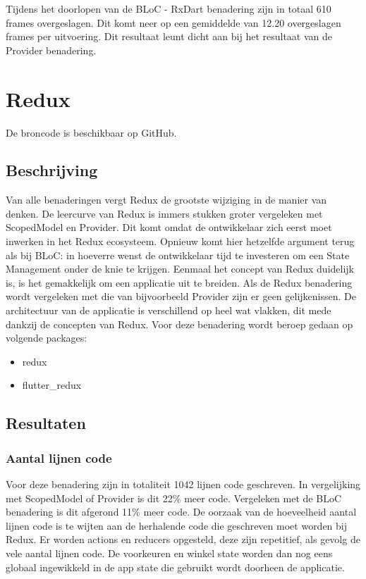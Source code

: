 Tijdens het doorlopen van de BLoC - RxDart benadering zijn in totaal 610 frames overgeslagen. Dit komt neer op een gemiddelde van 12.20 overgeslagen frames per uitvoering. Dit resultaat leunt dicht aan bij het resultaat van de Provider benadering.

\section{Redux}
De broncode is beschikbaar op GitHub. \autocite{DeVrient2019d}
\subsection{Beschrijving}
Van alle benaderingen vergt Redux de grootste wijziging in de manier van denken. De leercurve van Redux is immers stukken groter vergeleken met ScopedModel en Provider. Dit komt omdat de ontwikkelaar zich eerst moet inwerken in het Redux ecosysteem. Opnieuw komt hier hetzelfde argument terug als bij BLoC: in hoeverre wenst de ontwikkelaar tijd te investeren om een State Management onder de knie te krijgen. Eenmaal het concept van Redux duidelijk is, is het gemakkelijk om een applicatie uit te breiden. 
Als de Redux benadering wordt vergeleken met die van bijvoorbeeld Provider zijn er geen gelijkenissen. De architectuur van de applicatie is verschillend op heel wat vlakken, dit mede dankzij de concepten van Redux. \newline \newline
Voor deze benadering wordt beroep gedaan op volgende packages: 
\begin{itemize}
    \item{redux}
    \item{flutter\_redux}
\end{itemize}
\subsection{Resultaten}


\subsubsection{Aantal lijnen code}
Voor deze benadering zijn in totaliteit 1042 lijnen code geschreven. In vergelijking met ScopedModel of Provider is dit 22\% meer code. Vergeleken met de BLoC benadering is dit afgerond 11\% meer code. \newline
De oorzaak van de hoeveelheid aantal lijnen code is te wijten aan de herhalende code die geschreven moet worden bij Redux. Er worden actions en reducers opgesteld, deze zijn repetitief, als gevolg de vele aantal lijnen code. De voorkeuren en winkel state worden dan nog eens globaal ingewikkeld in de app state die gebruikt wordt doorheen de applicatie.

